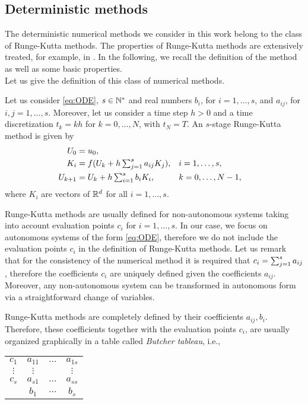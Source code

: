 \subsection{Deterministic methods}

The deterministic numerical methods we consider in this work belong to the class of Runge-Kutta methods. The properties of Runge-Kutta methods are extensively treated, for example, in \cite{HLW02, HaW96}. In the following, we recall the definition of the method as well as some basic properties. \\
Let us give the definition of this class of numerical methods.
\begin{definition}\label{def:RK} Let us consider \eqref{eq:ODE}, $s \in \mathbb{N}^*$ and real numbers $b_i$, for $i = 1, \ldots, s$, and $a_{ij}$, for $i, j = 1, \ldots, s$. Moreover, let us consider a time step $h > 0$ and a time discretization $t_k = kh$ for $k = 0, \ldots, N$, with $t_N = T$. An $s$-stage Runge-Kutta method is given by
\begin{equation}
\begin{aligned}
	U_0 &= u_0, \\
	K_i &= f(U_k + h\textstyle\sum_{j=1}^s a_{ij}K_j), && i = 1, \ldots, s, \\
	U_{k+1} &= U_k + h \textstyle\sum_{i=1}^s b_i K_i, && k = 0, \ldots, N-1,
\end{aligned}
\end{equation}
where $K_i$ are vectors of $\mathbb{R}^d$ for all $i = 1, \ldots, s$.
\end{definition}
\begin{remark} Runge-Kutta methods are usually defined for non-autonomous systems taking into account evaluation points $c_i$ for $i = 1, \ldots, s$. In our case, we focus on autonomous systems of the form \eqref{eq:ODE}, therefore we do not include the evaluation points $c_i$ in the definition of Runge-Kutta methods. Let us remark that for the consistency of the numerical method it is required that $c_i = \textstyle\sum_{j=1}^s a_{ij}$, therefore the coefficients $c_i$ are uniquely defined given the coefficients $a_{ij}$. Moreover, any non-autonomous system can be transformed in autonomous form via a straightforward change of variables. 
\end{remark}
\noindent Runge-Kutta methods are completely defined by their coefficients $a_{ij}, b_i$. Therefore, these coefficients together with the evaluation points $c_i$, are usually organized graphically in a table called \textit{Butcher tableau}, i.e.,
\begin{center}
	\begin{tabular}{c|ccc}
		$c_1$ & $a_{11}$ & $\ldots$ & $a_{1s}$\\
		$\vdots$ & $\vdots$ & & $\vdots$ \\
		$c_s$ & $a_{s1}$ & $\ldots$ & $a_{ss}$\\
		\hline 
		&$b_1$ & $\ldots$ & $b_s$
	\end{tabular}
\end{center}
